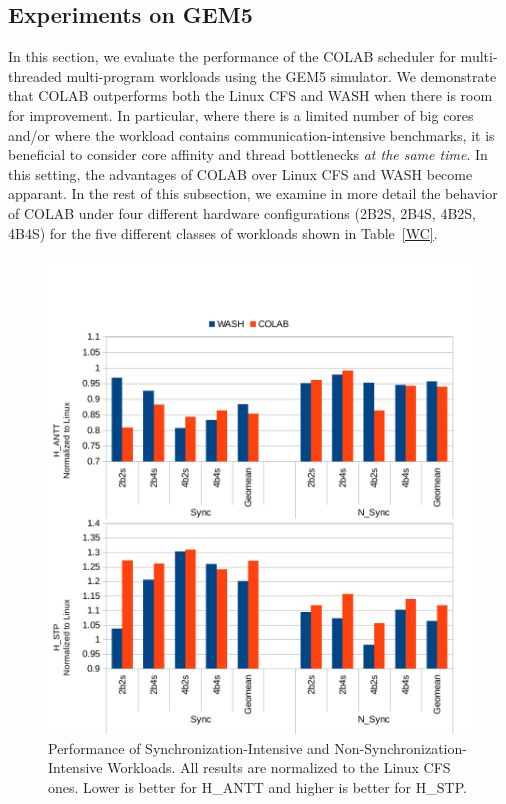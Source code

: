 \subsection{Experiments on GEM5}
In this section, we evaluate the performance of the COLAB scheduler for multi-threaded multi-program workloads using the GEM5 simulator. We demonstrate that COLAB outperforms both the Linux CFS and WASH when there is room for improvement. In particular, where there is a limited number of big cores and/or where the workload contains communication-intensive benchmarks, it is beneficial to consider core affinity and thread bottlenecks \emph{at the same time}. In this setting, the advantages of COLAB over Linux CFS and WASH become apparant. In the rest of this subsection, we examine in more detail the behavior of COLAB under four different hardware configurations
(2B2S, 2B4S, 4B2S, 4B4S) 
for the five different classes of workloads shown in Table~\ref{WC}.

\begin{figure}
\centering
\includegraphics[scale=0.55]{figures/sync.pdf}
\caption{Performance of Synchronization-Intensive and Non-Synchronization-Intensive Workloads. All results are normalized to the Linux CFS ones. Lower is better for H\_ANTT and higher is better for H\_STP.}
\label{sync}
\end{figure} 

